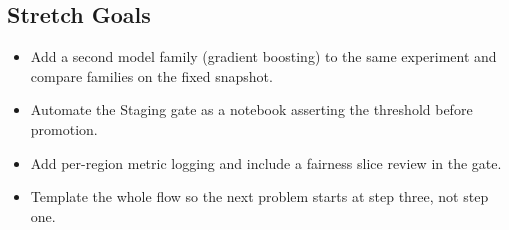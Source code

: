 \subsection*{Stretch Goals}
\begin{itemize}
    \item Add a second model family (gradient boosting) to the same experiment and compare families on the fixed snapshot.
    \item Automate the Staging gate as a notebook asserting the threshold before promotion.
    \item Add per-region metric logging and include a fairness slice review in the gate.
    \item Template the whole flow so the next problem starts at step three, not step one.
\end{itemize}

